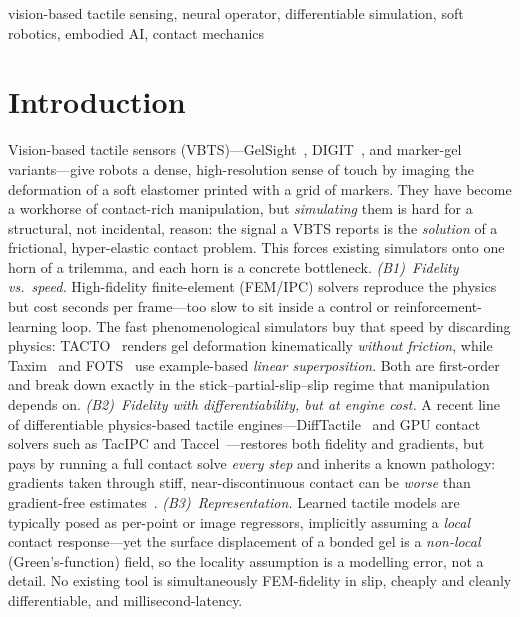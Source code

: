 \documentclass[conference]{IEEEtran}
\begin{document}
\begin{IEEEkeywords}
vision-based tactile sensing, neural operator, differentiable simulation,
soft robotics, embodied AI, contact mechanics
\end{IEEEkeywords}

\section{Introduction}\label{sec:intro}

Vision-based tactile sensors (VBTS)---GelSight~\cite{yuan2017gelsight},
DIGIT~\cite{lambeta2020digit}, and marker-gel variants---give robots a dense,
high-resolution sense of touch by imaging the deformation of a soft elastomer
printed with a grid of markers. They have become a workhorse of contact-rich
manipulation, but \emph{simulating} them is hard for a structural, not incidental,
reason: the signal a VBTS reports is the \emph{solution} of a frictional,
hyper-elastic contact problem. This forces existing simulators onto one horn of a
trilemma, and each horn is a concrete bottleneck.
\emph{(B1)~Fidelity vs.\ speed.} High-fidelity finite-element (FEM/IPC) solvers
reproduce the physics but cost seconds per frame---too slow to sit inside a
control or reinforcement-learning loop. The fast phenomenological simulators buy
that speed by discarding physics: TACTO~\cite{wang2022tacto} renders gel
deformation kinematically \emph{without friction}, while
Taxim~\cite{si2022taxim} and FOTS~\cite{zhao2023fots} use example-based
\emph{linear superposition}. Both are first-order and break down exactly in the
stick--partial-slip--slip regime that manipulation depends on.
\emph{(B2)~Fidelity with differentiability, but at engine cost.} A recent line of
differentiable physics-based tactile engines---DiffTactile~\cite{si2024difftactile}
and GPU contact solvers such as TacIPC and Taccel~\cite{taccel2025}---restores both
fidelity and gradients, but pays by running a full contact solve \emph{every step}
and inherits a known pathology: gradients taken through stiff, near-discontinuous
contact can be \emph{worse} than gradient-free estimates~\cite{suh2022diffsim}.
\emph{(B3)~Representation.} Learned tactile models are typically posed as
per-point or image regressors, implicitly assuming a \emph{local} contact
response---yet the surface displacement of a bonded gel is a \emph{non-local}
(Green's-function) field, so the locality assumption is a modelling error, not a
detail. No existing tool is simultaneously FEM-fidelity in slip, cheaply and
cleanly differentiable, and millisecond-latency.
\end{document}
